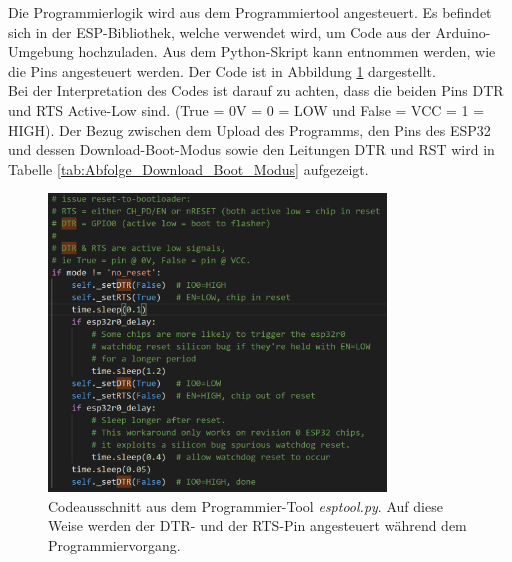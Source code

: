 Die Programmierlogik wird aus dem Programmiertool angesteuert. Es befindet sich in der ESP-Bibliothek, welche verwendet wird, um Code aus der Arduino-Umgebung hochzuladen. Aus dem Python-Skript kann entnommen werden, wie die Pins angesteuert werden. Der Code ist in Abbildung \ref{fig:ESP32_Boot_Code} dargestellt.\\
Bei der Interpretation des Codes ist darauf zu achten, dass die beiden Pins DTR und RTS Active-Low sind. (True = 0V = 0 = LOW und False = VCC = 1 = HIGH). Der Bezug zwischen dem Upload des Programms, den Pins des ESP32 und dessen Download-Boot-Modus sowie den Leitungen DTR und RST wird in Tabelle \ref{tab:Abfolge_Download_Boot_Modus} aufgezeigt. \cite{loboriseu_esp32_autoresetjpg_2017}

\begin{figure}[H]
	\centering
	\includegraphics[width=0.8\textwidth]{graphics/ESP32_Boot_Code}
	\caption{Codeausschnitt aus dem Programmier-Tool \textit{esptool.py}. Auf diese Weise werden der DTR- und der RTS-Pin angesteuert während dem Programmiervorgang.}
	\label{fig:ESP32_Boot_Code}
\end{figure}

